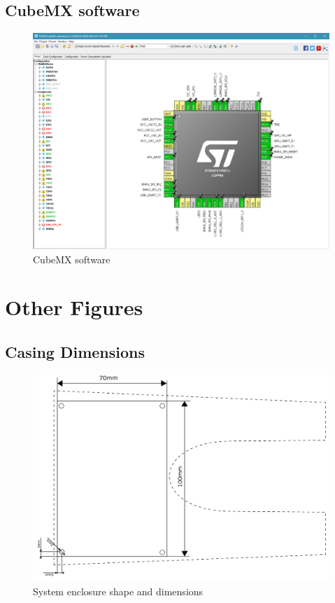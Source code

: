 \subsection{CubeMX software}
\begin{figure}[tbh]
	\centering
    \includegraphics[width=\linewidth]{Figures/MXCube.png}
	\caption{CubeMX software}
	\label{fig:mxc}
\end{figure}

\clearpage
\section{Other Figures}
\subsection{Casing Dimensions}
\begin{figure}[htb]
	\centering
    \includegraphics[width=\linewidth]{Figures/casing_dimensions.png}
	\caption{System enclosure shape and dimensions}
	\label{fig:casdim}
\end{figure}



